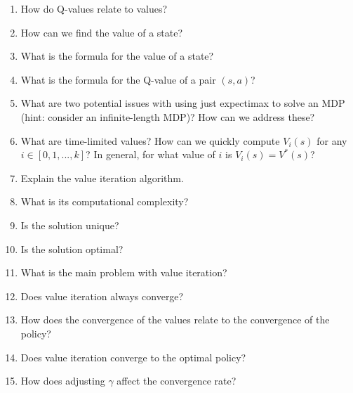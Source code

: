 \documentclass[]{article}
\begin{document}
\begin{enumerate}
\item How do Q-values relate to values?
\item How can we find the value of a state?
\item What is the formula for the value of a state?
\item What is the formula for the Q-value of a pair $(s,a)$?
\item What are two potential issues with using just expectimax to solve an MDP (hint: consider an infinite-length MDP)? How can we address these? \\
\item What are time-limited values? How can we quickly compute $V_{i}(s)$ for any $i \in [0,1,...,k]$? In general, for what value of $i$ is $V_{i}(s) = V^{*}(s)$? \\
\item Explain the value iteration algorithm.
\item What is its computational complexity?
\item Is the solution unique?
\item Is the solution optimal?
\item What is the main problem with value iteration?
\item Does value iteration always converge?
\item How does the convergence of the values relate to the convergence of the policy?
\item Does value iteration converge to the optimal policy?
\item How does adjusting $\gamma$ affect the convergence rate? \\
\end{enumerate}
\end{document}

